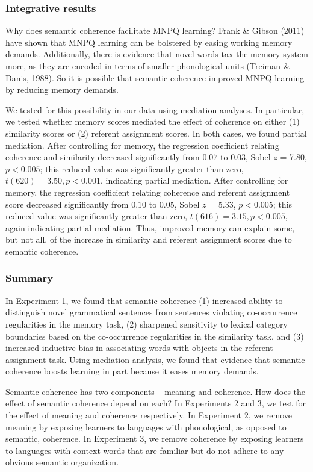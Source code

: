 \documentclass[man,floatsintext]{apa6}
\begin{document}
\subsubsection{Integrative results}
Why does semantic coherence facilitate MNPQ learning? Frank \& Gibson
(2011) have shown that MNPQ learning can be bolstered by easing
working memory demands. Additionally, there is evidence that novel
words tax the memory system more, as they are encoded in terms of
smaller phonological units (Treiman \& Danis, 1988). So it is possible
that semantic coherence improved MNPQ learning by reducing memory
demands.

We tested for this possibility in our data using mediation
analyses. In particular, we tested whether memory scores mediated the
effect of coherence on either (1) similarity scores or (2) referent
assignment scores. In both cases, we found partial mediation. After
controlling for memory, the regression coefficient relating coherence
and similarity decreased significantly from $0.07$ to $0.03$, Sobel
$z$ = 7.80, $p < 0.005$; this reduced value was significantly greater
than zero, $t(620) = 3.50, p < 0.001$, indicating partial
mediation. After controlling for memory, the regression coefficient
relating coherence and referent assignment score decreased
significantly from $0.10$ to $0.05$, Sobel $z$ = 5.33, $p < 0.005$;
this reduced value was significantly greater than zero, $t(616) =
3.15, p < 0.005$, again indicating partial mediation. Thus, improved
memory can explain some, but not all, of the increase in similarity
and referent assignment scores due to semantic coherence.

\subsubsection{Summary}

In Experiment 1, we found that semantic coherence (1) increased
ability to distinguish novel grammatical sentences from sentences
violating co-occurrence regularities in the memory task, (2) sharpened
sensitivity to lexical category boundaries based on the co-occurrence
regularities in the similarity task, and (3) increased inductive bias
in associating words with objects in the referent assignment
task. Using mediation analysis, we found that evidence that semantic
coherence boosts learning in part because it eases memory demands.

Semantic coherence has two components -- meaning and coherence. How
does the effect of semantic coherence depend on each? In Experiments 2
and 3, we test for the effect of meaning and coherence
respectively. In Experiment 2, we remove meaning by exposing learners
to languages with phonological, as opposed to semantic, coherence. In
Experiment 3, we remove coherence by exposing learners to languages
with context words that are familiar but do not adhere to any obvious
semantic organization.
\end{document}
